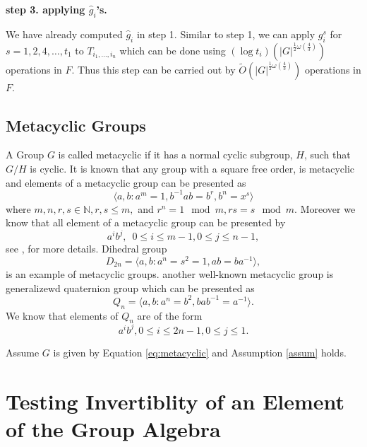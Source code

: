 \documentclass[sigconf]{acmart}
\theoremstyle{acmplain}
\begin{document}
\textbf{step 3. applying $\hat{g}_i$'s.}

We have already computed $\hat{g}_i$ in step 1. Similar to step 1, we can apply $g_i^s$ 
for $s = 1, 2, 4 , \ldots, t_1$ to $T_{i_1, \ldots , i_n}$ which can be done using $(\log t_i)(\vert G \vert^{\frac{1}{2}\omega
(\frac{4}{3})})$ operations in $F$. Thus this step can be carried out by $\tilde{O}(\vert G \vert^{\frac{1}{2}\omega
(\frac{4}{3})})$ operations in $F$.

\subsection{Metacyclic Groups}

A Group $G$ is called metacyclic if it has a normal cyclic subgroup, $H$, such that $G/H$ is cyclic. It is known that any group
with a square free order, is metacyclic and elements of a metacyclic group can be presented as 
\begin{equation}\label{eq:metacyclic}
\langle a,b: a^m = 1, b^{-1}ab = b^r, b^n = x^s \rangle
\end{equation}
where $m,n,r,s \in \mathbb{N}, r,s \leq m,$ and $r^n = 1 \mod m , rs = s \mod m$. Moreover we know that all element of a metacyclic
 group can be presented by $$a^ib^j, \,\,\, 0\leq i \leq m-1, 0\leq j \leq n-1,$$ 
see \cite[P.88, Proposition 1]{Johnson}, \cite[P.334]{Curtis} for more details. Dihedral group 
$$D_{2n} = \langle a,b: a^n =s^2 = 1, ab = ba^{-1} \rangle, $$
is an example of metacyclic groups. another well-known metacyclic group is generalizewd quaternion
 group which can be presented as
 $$Q_n = \langle a,b: a^n =b^2, bab^{-1} = a^{-1} \rangle.$$
 We know that elements of $Q_n$ are of the form 
 $$a^ib^j, 0 \leq i \leq 2n-1 , 0\leq j \leq 1.$$
 
 Assume $G$ is given by Equation \ref{eq:metacyclic} and Assumption \ref{assum} holds.

\section{Testing Invertiblity of an Element of the Group Algebra}




 
\end{document}
